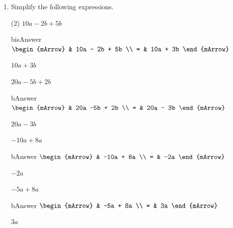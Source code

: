 \begin{enumerate}[resume]	
  \item Simplify the following expressions.
  \begin{subtask}(2)
    \task[]  $ 10a - 2b + 5b  $
              \begin{envOut}[height=6cm]{bisAnswer}
			       $\begin{mArrow}
			                & 10a  - 2b + 5b       \\ 
                          = & 10a  + 3b  
	                \end{mArrow}$
              \end{envOut}			  
			  \begin{exercise}\begin{shortsolution}  
				       $10a  + 3b$
			  \end{shortsolution}\end{exercise}
			  
    \task[]  $ 20a  -5b + 2b   $
              \begin{envOut}[height=6cm]{bAnswer}
			       $\begin{mArrow}
			                & 20a   -5b + 2b       \\ 
                          = & 20a - 3b	  
	                \end{mArrow}$
              \end{envOut}			  
			  \begin{exercise}\begin{shortsolution}  
				       $20a - 3b$
			  \end{shortsolution}\end{exercise}			  

    \task[]  $ -10a  + 8a  $
              \begin{envOut}[height=6cm]{bAnswer}
			       $\begin{mArrow}
			                & -10a  + 8a       \\ 
                          = & -2a	  
	                \end{mArrow}$
              \end{envOut}			  
			  \begin{exercise}\begin{shortsolution}  
				       $-2a$
			  \end{shortsolution}\end{exercise}			  
			  
    \task[]  $ -5a  + 8a  $
              \begin{envOut}[height=6cm]{bAnswer}
			       $\begin{mArrow}
			                & -5a  + 8a       \\ 
                          = & 3a	  
	                \end{mArrow}$
              \end{envOut}			  
			  \begin{exercise}\begin{shortsolution}  
				       $3a$
			  \end{shortsolution}\end{exercise}			  


\end{subtask}
\end{enumerate}
